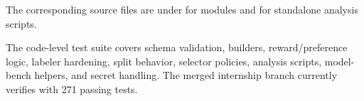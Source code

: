 The corresponding source files are under  for modules and  for standalone analysis scripts.

The code-level test suite covers schema validation, builders, reward/preference logic, labeler hardening, split behavior, selector policies, analysis scripts, model-bench helpers, and secret handling. The merged internship branch currently verifies with 271 passing tests.
